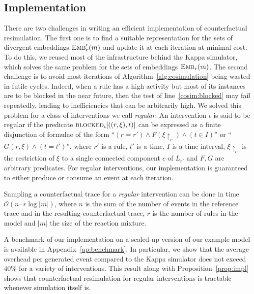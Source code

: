
\subsection{Implementation}\label{subsec:implementation}

There are two challenges in writing an efficient implementation of
counterfactual resimulation. The first one is to find a suitable
representation for the sets of divergent embeddings ${\textsc{Emb}}'_{r}(m)$ and
update it at each iteration at minimal cost. To do this, we reused
most of the infrastructure behind the Kappa simulator, which solves
the same problem for the sets of embeddings ${\textsc{Emb}}_{r}(m)$. The second
challenge is to avoid most iterations of
Algorithm~\ref{alg:cosimulation} being wasted in {futile
  cycles}. Indeed, when a rule has a high activity but most of its
instances are to be blocked in the near future, then the test of
line~\ref{cosim:blocked} may fail repeatedly, leading to
inefficiencies that can be arbitrarily high. We solved this problem
for a class of interventions we call \emph{regular}. An intervention
$\iota$ is said to be regular if the predicate
${\textsc{blocked}}_{\iota}[((r, \xi), t)]$ can be expressed as a finite
disjunction of formulae of the form
``$(r = r') \wedge F(\xi{\restriction_{c}}) \wedge (t \in I)$''
or ``$G(r, \xi) \wedge (t = t')$'',
where $r'$ is a rule, $t'$ is a time,
$I$ is a time interval, $\xi{\restriction_{c}}$ is the
restriction of $\xi$ to a single connected component $c$ of $L_{r'}$
and $F, G$ are arbitrary predicates. For regular interventions,
our implementation is guaranteed to either produce or
consume an event at each iteration.

\begin{proposition}\label{prop:impl}
  Sampling a counterfactual trace for a \emph{regular} intervention
  can be done in time $\mathcal{O}(n \cdot r \log|m|)$, where $n$ is
  the sum of the number of events in the reference trace and in the
  resulting counterfactual trace, $r$ is the number of rules in the
  model and $|m|$ the size of the reaction mixture.
\end{proposition}

A benchmark of our implementation on a scaled-up version of our
example model is available in Appendix~\ref{ap:benchmark}. In
particular, we show that the average overhead per generated event
compared to the Kappa simulator does not exceed 40\% for a variety of
interventions. This result along with Proposition~\ref{prop:impl}
shows that counterfactual resimulation for regular interventions is
tractable whenever simulation itself is.

\medskip